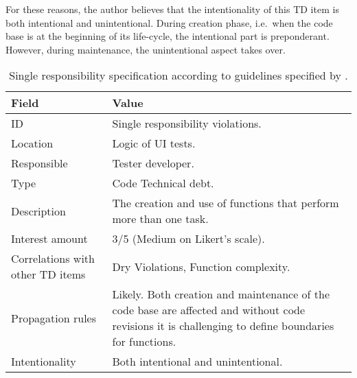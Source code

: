     For these reasons, the author believes that the intentionality of this TD item is both intentional and unintentional. During creation phase, i.e.\ when the code base is at the beginning of its life-cycle, the intentional part is preponderant. However, during maintenance, the unintentional aspect takes over.
        
    
    	\begin{table}[!htbp]
		\centering
		\tabulinesep=1.2mm
		\begin{tabu} to \textwidth {|X|X[3]|}
			
			\hline
			\textbf{Field} & \textbf{Value} \\ 
			\hline
			
			ID & Single responsibility violations. \\
			\hline
			
			Location & Logic of UI tests. \\
			\hline
			
			Responsible & Tester developer. \\
			\hline
			
			Type & Code Technical debt. \\
			\hline	
			
			Description & The creation and use of functions that perform more than one task.\\
			\hline
			
			
			
			Interest amount &  3/5 (Medium on Likert's scale). \\
			\hline
			
			
			
			Correlations with other TD items & Dry Violations, Function complexity. \\
			\hline 	 
			
			
			
			Propagation rules & Likely. Both creation and maintenance of the code base are affected and without code revisions it is challenging to define boundaries for functions.\\
			\hline
			
			Intentionality & Both intentional and unintentional. \\
			\hline 	 	
			
		\end{tabu}
		\label{tab:res-single-responsibility}
		\caption[Single responsibility specification]{Single responsibility specification according to guidelines specified by \cite{mapping_study_td}.}
	\end{table}
	
